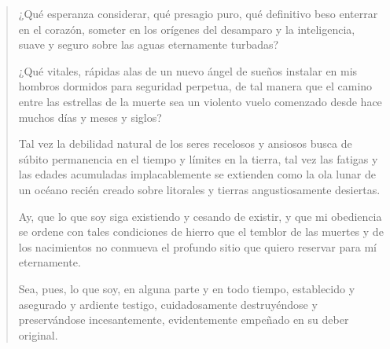 \documentclass[12pt]{article}
\begin{document}
\clearpage
{}
\begin{verse}
¿Qué esperanza considerar, qué presagio puro,  
qué definitivo beso enterrar en el corazón,  
someter en los orígenes del desamparo y la inteligencia,  
suave y seguro sobre las aguas eternamente turbadas?  
  
¿Qué vitales, rápidas alas de un nuevo ángel de sueños  
instalar en mis hombros dormidos para seguridad perpetua,  
de tal manera que el camino entre las estrellas de la muerte  
sea un violento vuelo comenzado desde hace muchos días y meses y siglos?  
  
Tal vez la debilidad natural de los seres recelosos y ansiosos  
busca de súbito permanencia en el tiempo y límites en la tierra,  
tal vez las fatigas y las edades acumuladas implacablemente  
se extienden como la ola lunar de un océano recién creado  
sobre litorales y tierras angustiosamente desiertas.  
  
Ay, que lo que soy siga existiendo y cesando de existir,  
y que mi obediencia se ordene con tales condiciones de hierro  
que el temblor de las muertes y de los nacimientos no conmueva  
el profundo sitio que quiero reservar para mí eternamente.  
  
Sea, pues, lo que soy, en alguna parte y en todo tiempo,  
establecido y asegurado y ardiente testigo,  
cuidadosamente destruyéndose y preservándose incesantemente,  
evidentemente empeñado en su deber original.

\end{verse}
\end{document}
